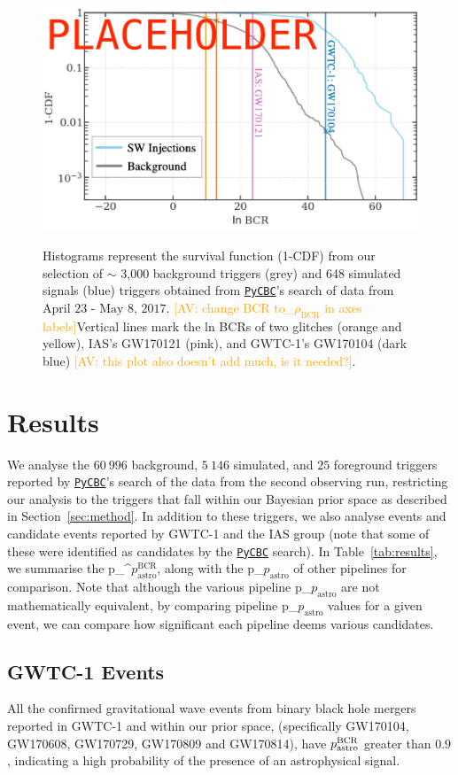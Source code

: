 \documentclass[%
 nofootinbib,
 amsmath,amssymb,
 aps,
 twocolumn
]{revtex4-2}
\newcommand{\pycbc}{{\sc \href{https://pycbc.org/}{\texttt{PyCBC}}}\xspace}
\newcommand{\fancytext}[1]{{\relax\ifmmode#1\else $#1$\fi}\xspace}
\newcommand{\mathcmd}[1]{{\sc \relax\ifmmode#1\else $#1$\fi}\xspace}
\newcommand{\bcr}{\mathcmd{\rho_\text{BCR}}}
\newcommand{\pastro}{\fancytext{p_\text{astro}}}
\newcommand{\pastrobcr}{\fancytext{p_\text{astro}^{\text{BCR}}}}
\newcommand{\av}[1]{\textcolor{orange}{[AV: #1]}}
\begin{document}
\begin{figure}[!ht]
{\centering \includegraphics[width=0.75\linewidth]{images/bcr_cdf} }
\caption[BCR distribution example]{Histograms represent the survival function (1-CDF) from our selection of $\sim$ 3,000 background triggers (grey) and 648 simulated signals (blue) triggers obtained from \pycbc's search of data from $\text{April 23 - May 8, 2017}$. \av{change BCR to\bcr in axes labels}Vertical lines mark the ln BCRs of two glitches (orange and yellow), IAS's GW170121 (pink), and GWTC-1's GW170104 (dark blue) \av{this plot also doesn't add much, is it needed?}.}\label{fig:bcrCdf}
\end{figure}


\section{\label{sec:Results}Results}


We analyse the $60\ 996$ background, $5\ 146$ simulated, and $25$ foreground triggers reported by \pycbc's search of the data from the second observing run, restricting our analysis to the triggers that fall within our Bayesian prior space as described in Section~\ref{sec:method}. In addition to these triggers, we also analyse events and candidate events reported by GWTC-1 and the IAS group (note that some of these were identified as candidates by the \pycbc search). In Table~\ref{tab:results}, we summarise the \pastrobcr, along with the \pastro of other pipelines for comparison. Note that although the various pipeline \pastro are not mathematically equivalent, by comparing pipeline \pastro values for a given event, we can compare how significant each pipeline deems various candidates.  


\subsection{GWTC-1 Events}
All the confirmed gravitational wave events from binary black hole mergers reported in GWTC-1 and within our prior space, (specifically GW170104, GW170608, GW170729, GW170809 and GW170814), have $\pastrobcr$ greater than $0.9$, indicating a high probability of the presence of an astrophysical signal. 
\end{document}
